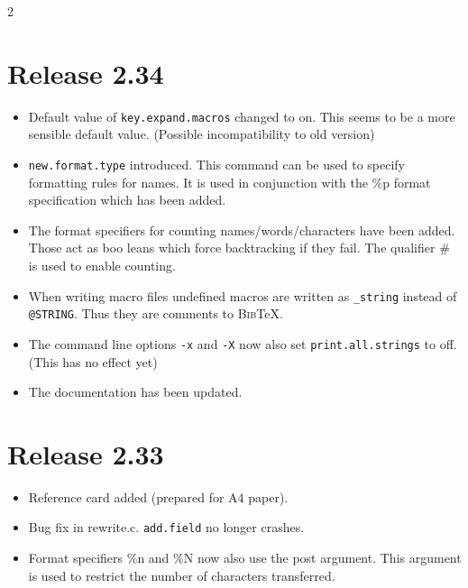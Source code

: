 \documentclass[11pt,a4paper]{scrartcl}
\newcommand\Arg[1]{\texttt{#1}}
\newcommand\rsc[1]{\texttt{#1}}
\newcommand\File[1]{\textsf{#1}}
\newcommand\BibTeX{\textsc{Bib}\TeX}
\newenvironment{Releases}{\begin{multicols}2\RaggedRight}{\end{multicols}}
\newenvironment{Release}[2]{%
  \def\tmp{#2}%
  \section*{Release #1 \ifx\tmp\empty\else{\normalsize[#2]}\fi}
  \begin{itemize}
}{\end{itemize}}
\newenvironment{Fix}[1]{\item }{}
\newenvironment{New}[1]{\item }{}
\newenvironment{Doc}[1]{\item }{}
\newenvironment{Update}[1]{\item }{}
\begin{document}
\begin{Releases}
 \begin{Release}{2.34}{}
  \begin{Update}{gene}
    Default value of \rsc{key.expand.macros} changed to on. This seems
    to be a more sensible default value. (Possible incompatibility to old
    version)
  \end{Update}
  \begin{New}{gene}
    \rsc{new.format.type} introduced. This command can be used to
    specify formatting rules for names. It is used in conjunction with the \%p
    format specification which has been added.
  \end{New}
  \begin{New}{gene}
    The format specifiers for counting names/words/characters have been added.
    Those act as boo leans which force backtracking if they fail. The qualifier
    \# is used to enable counting.
  \end{New}
  \begin{Update}{gene}
    When writing macro files undefined macros are written as
    \verb|_string| instead of \verb|@STRING|. Thus they are
    comments to \BibTeX{}.
  \end{Update}
  \begin{Update}{gene}
    The command line options \Arg{-x} and \Arg{-X} now also set
    \rsc{print.all.strings} to off. (This has no effect yet)
  \end{Update}
  \begin{Doc}{gene}
    The documentation has been updated.
  \end{Doc}
 \end{Release}

 \begin{Release}{2.33}{}
  \begin{New}{gene}
    Reference card added (prepared for A4 paper).
  \end{New}
  \begin{Fix}{gene}
    Bug fix in \File{rewrite.c}. \rsc{add.field} no longer crashes.
  \end{Fix}
  \begin{Update}{gene}
    Format specifiers \%n and \%N now also use the post argument. This
    argument is used to restrict the number of characters transferred.
  \end{Update}
 \end{Release}


\end{Releases}
\end{document}
